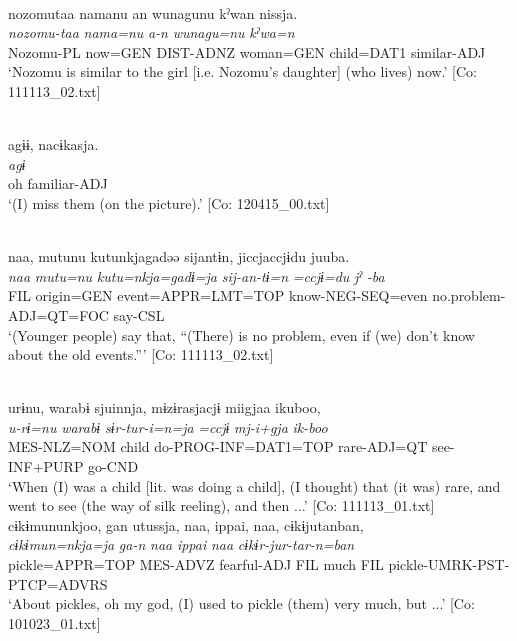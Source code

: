   \ex{}\\
\glll nozomutaa  namanu  an  wunagunu  kˀwan   nissja.\\
      \textit{nozomu-taa}  \textit{nama=nu}  \textit{a-n}  \textit{wunagu=nu}  \textit{kˀwa=n} \textit{}\\
      Nozomu-PL  now=GEN  DIST-ADNZ  woman=GEN  child=DAT1  similar-ADJ\\
      \glt    ‘Nozomu is similar to the girl [i.e. Nozomu’s daughter] (who lives) now.’  [Co: 111113\_02.txt]

 \ex\relax [= (4-50 a)]\\
    \glll  agɨɨ,  nacɨkasja.\\
      \textit{agɨ}  \textit{}\\
      oh  familiar-ADJ\\
      \glt       ‘(I) miss them (on the picture).’ [Co: 120415\_00.txt]

 \ex\relax  [= (8-104 a)]\\
    \glll  naa,  mutunu  kutunkjagadəə  sijantɨn,  jiccjaccjɨdu  juuba.\\
      \textit{naa}  \textit{mutu=nu}  \textit{kutu=nkja=gadɨ=ja}  \textit{sij-an-tɨ=n}     \textit{=ccjɨ=du}  \textit{jˀ} \textit{-ba}\\
      FIL  origin=GEN  event=APPR=LMT=TOP  know-NEG-SEQ=even  no.problem-ADJ=QT=FOC  say-CSL\\
      \glt       ‘(Younger people) say that, “(There) is no problem, even if (we) don’t know about the old events.”’ [Co: 111113\_02.txt]

\ex{}\\
    \glll  urɨnu,  warabɨ  sjuinnja,  mɨzɨrasjacjɨ  miigjaa  ikuboo,\\
      \textit{u-rɨ=nu}  \textit{warabɨ}  \textit{sɨr-tur-i=n=ja}  \textit{=ccjɨ}     \textit{mj-i+gja}  \textit{ik-boo}\\
      MES-NLZ=NOM  child  do-PROG-INF=DAT1=TOP  rare-ADJ=QT   see-INF+PURP  go-CND      \\
      \glt       ‘When (I) was a child [lit. was doing a child], (I thought) that (it was) rare, and went to see (the way of silk reeling), and then ...’ [Co: 111113\_01.txt]
\ex %
\glll      cɨkɨmununkjoo,  gan  utussja,  naa,  ippai,  naa,  cɨkɨjutanban,\\
      \textit{cɨkɨmun=nkja=ja}  \textit{ga-n}  \textit{}  \textit{naa}  \textit{ippai}  \textit{naa}  \textit{cɨkɨr-jur-tar-n=ban}\\
      pickle=APPR=TOP  MES-ADVZ  fearful-ADJ  FIL  much  FIL    pickle-UMRK-PST-PTCP=ADVRS\\
      \glt       ‘About pickles, oh my god, (I) used to pickle (them) very much, but ...’ [Co: 101023\_01.txt]

